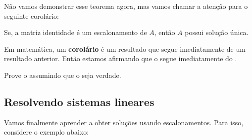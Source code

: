Não vamos demonstrar esse teorema agora, mas vamos chamar a atenção para o seguinte corolário:

\begin{cor}\label{cor:sol-id}
	Se, a matriz identidade é um escalonamento de $A$, então $A$ possui solução única.
\end{cor}

\begin{rmk}
	Em matemática, um \textbf{corolário} é um resultado que segue imediatamente de um resultado anterior. Então estamos afirmando que o
	 segue imediatamente do .
\end{rmk}

\begin{exerc}
	Prove o  assumindo que o  seja verdade.
\end{exerc}

\bigskip
\subsection{Resolvendo sistemas lineares}

Vamos finalmente aprender a obter soluções usando escalonamentos. Para isso, considere o exemplo abaixo:

